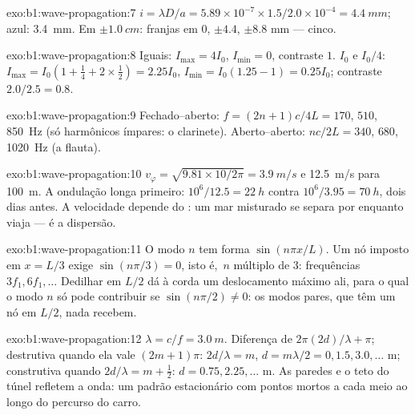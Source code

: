 \begin{solution}{exo:b1:wave-propagation:7}
$i = \lambda D/a = 5.89\times10^{-7} \times 1.5/2.0\times10^{-4} =
\qty{4.4}{mm}$; azul: \qty{3.4}{mm}. Em $\pm\qty{1.0}{cm}$: franjas em
$0$, $\pm 4.4$, $\pm 8.8$ mm --- cinco.
\end{solution}

\begin{solution}{exo:b1:wave-propagation:8}
Iguais: $I_{\max} = 4I_0$, $I_{\min} = 0$, contraste $1$. $I_0$ e $I_0/4$:
$I_{\max} = I_0(1 + \tfrac14 + 2 \times \tfrac12) = 2.25I_0$, $I_{\min} =
I_0(1.25 - 1) = 0.25I_0$; contraste $2.0/2.5 = 0.8$.
\end{solution}

\begin{solution}{exo:b1:wave-propagation:9}
Fechado--aberto: $f = (2n + 1)c/4L = 170$, $510$, \qty{850}{Hz} (só
harmônicos ímpares: o clarinete). Aberto--aberto: $nc/2L = 340$, $680$,
\qty{1020}{Hz} (a flauta).
\end{solution}

\begin{solution}{exo:b1:wave-propagation:10}
$v_\varphi = \sqrt{9.81 \times 10/2\pi} = \qty{3.9}{m/s}$ e
\qty{12.5}{m/s} para \qty{100}{m}. A ondulação longa primeiro: $10^6/12.5 =
\qty{22}{h}$ contra $10^6/3.95 = \qty{70}{h}$, dois dias antes. A velocidade
depende do : um mar misturado se separa por  enquanto
viaja --- é a dispersão.
\end{solution}

\begin{solution}{exo:b1:wave-propagation:11}
O modo $n$ tem forma $\sin(n\pi x/L)$. Um nó imposto em $x = L/3$ exige
$\sin(n\pi/3) = 0$, isto é,\ $n$ múltiplo de $3$: frequências $3f_1,
6f_1, \dots$ Dedilhar em $L/2$ dá à corda um deslocamento máximo
ali, para o qual o modo $n$ só pode contribuir se $\sin(n\pi/2) \neq 0$:
os modos pares, que têm um nó em $L/2$, nada recebem.
\end{solution}

\begin{solution}{exo:b1:wave-propagation:12}
$\lambda = c/f = \qty{3.0}{m}$. Diferença de  $2\pi(2d)/\lambda + \pi$;
destrutiva quando ela vale $(2m + 1)\pi$: $2d/\lambda = m$,
$d = m\lambda/2 = 0, 1.5, 3.0, \dots$ m; construtiva quando $2d/\lambda =
m + \tfrac12$: $d = 0.75, 2.25, \dots$ m. As paredes e o teto do túnel refletem
a onda: um padrão estacionário com pontos mortos a cada meio  ao longo
do percurso do carro.
\end{solution}

